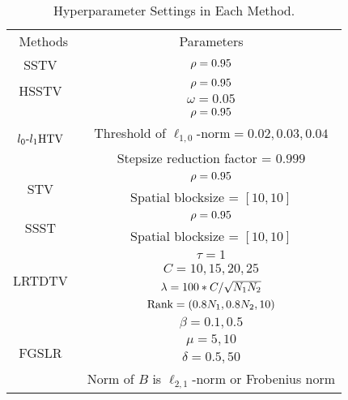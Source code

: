\begin{table}[!t]
	\begin{center}
		\caption{Hyperparameter Settings in Each Method.}
		\label{tab:HyperParam}
			\begin{tabular}{cc}
				\toprule
				Methods & Parameters \\
				\cmidrule(lr){1-2}
				SSTV~\cite{Aggarwal2016SSTV} 
				& $\rho = 0.95$
				\vspace{2mm} \\
				
				
				\multirow{2}{*}{HSSTV~\cite{Takeyama2020HSSTV}} 
				& $\rho = 0.95$ \\
				& $\omega = 0.05$ 
				\vspace{2mm} \\
				
				\multirow{3}{*}{${l_{0}\text{-}l_{1}\text{HTV}}$~\cite{Wang2021l0l1HTV}} 
				& $\rho = 0.95$ \\
				& Threshold of $\ell_{1,0}\text{-norm} = 0.02, 0.03, 0.04$ \\
				& Stepsize reduction factor = $0.999$
		 		\vspace{2mm} \\
				
				
				\multirow{2}{*}{STV~\cite{Lefkimmiatis2015STV}} 
				& $\rho = 0.95$ \\
				& Spatial blocksize = $[10, 10]$ 
				\vspace{2mm} \\
				
				
				\multirow{2}{*}{SSST~\cite{Kurihara2017SSST}} 
				& $\rho = 0.95$ \\
				& Spatial blocksize = $[10, 10]$ 
				\vspace{2mm} \\
				
				
				\multirow{4}{*}{LRTDTV~\cite{Wang2018LRTDTV}} 
				& $\tau = 1$ \\
				& $C = 10, 15, 20, 25$ \\
				& $\lambda = 100 * C / \sqrt{N_{1} N_{2}}$ \\
				& $\text{Rank} = (0.8N_{1}, 0.8N_{2}, 10)$ 
				\vspace{2mm} \\
				
				
				\multirow{4}{*}{FGSLR~\cite{Chen2022FGSLR}} 
				& $\beta = 0.1, 0.5$ \\
				& $\mu = 5, 10$ \\
				& $\delta = 0.5, 50$\\
				& Norm of $B$ is $\ell_{2,1}$-norm or Frobenius norm
				\vspace{2mm} \\
				



\end{tabular}
\end{center}
\end{table}
